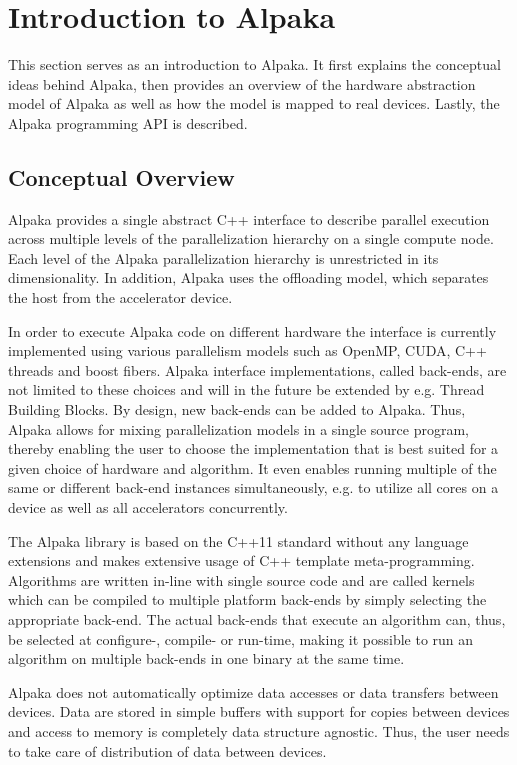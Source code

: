 \documentclass[10pt, twocolumn]{article}
\newcommand{\alpaka}{Alpaka\xspace}
\newcommand{\cuda}{{CUDA}\xspace}
\newcommand{\openmp}{{OpenMP}\xspace}
\begin{document}
 \section{Introduction to Alpaka}
This section serves as an introduction to \alpaka.
It first explains the conceptual ideas behind \alpaka, then provides an overview of the hardware abstraction model of \alpaka as well as how the model is mapped to real devices.
Lastly, the \alpaka programming API is described.

\subsection{Conceptual Overview}
\label{subsec:design}
\alpaka provides a single abstract C++ interface to describe parallel execution across multiple levels of the parallelization hierarchy on a single compute node. Each level of the \alpaka parallelization hierarchy is unrestricted in its dimensionality.
In addition, \alpaka uses the offloading model, which separates the host from the accelerator device.

In order to execute \alpaka code on different hardware the interface is currently implemented using various parallelism models such as \openmp, \cuda, C++ threads and boost fibers. \alpaka interface implementations, called back-ends, are not limited to these choices and will in the future be extended by e.g. Thread Building Blocks. By design, new back-ends can be added to \alpaka.
Thus, \alpaka allows for mixing parallelization models in a single source program, thereby enabling the user to choose the implementation that is best suited for a given choice of hardware and algorithm.
It even enables running multiple of the same or different back-end instances simultaneously, e.g. to utilize all cores on a device as well as all accelerators concurrently.

The \alpaka library is based on the C++11 standard without any language extensions and makes extensive usage of C++ template meta-programming.
Algorithms are written in-line with single source code and are called kernels which can be compiled to multiple platform back-ends by simply selecting the appropriate back-end. The actual back-ends that execute an algorithm can, thus, be selected at configure-, compile- or run-time, making it possible to run an algorithm on multiple back-ends in one binary at the same time.

\alpaka does not automatically optimize data accesses or data transfers between devices.
Data are stored in simple buffers with support for copies between devices and access to memory is completely data structure agnostic. Thus, the user needs to take care of distribution of data between devices.
\end{document}
